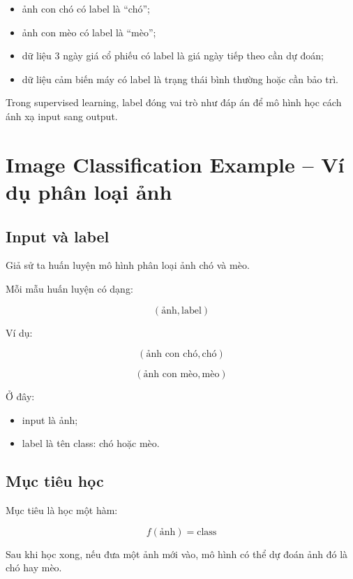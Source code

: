 \begin{itemize}
    \item ảnh con chó có label là ``chó'';
    \item ảnh con mèo có label là ``mèo'';
    \item dữ liệu 3 ngày giá cổ phiếu có label là giá ngày tiếp theo cần dự đoán;
    \item dữ liệu cảm biến máy có label là trạng thái bình thường hoặc cần bảo trì.
\end{itemize}

\begin{ghinho}
Trong supervised learning, label đóng vai trò như đáp án để mô hình học cách ánh xạ input sang output.
\end{ghinho}

\section{Image Classification Example -- Ví dụ phân loại ảnh}

\subsection{Input và label}

Giả sử ta huấn luyện mô hình phân loại ảnh chó và mèo.

Mỗi mẫu huấn luyện có dạng:

\[
    (\text{ảnh}, \text{label})
\]

Ví dụ:

\[
    (\text{ảnh con chó}, \text{chó})
\]

\[
    (\text{ảnh con mèo}, \text{mèo})
\]

Ở đây:

\begin{itemize}
    \item input là ảnh;
    \item label là tên class: chó hoặc mèo.
\end{itemize}

\subsection{Mục tiêu học}

Mục tiêu là học một hàm:

\[
    f(\text{ảnh}) = \text{class}
\]

Sau khi học xong, nếu đưa một ảnh mới vào, mô hình có thể dự đoán ảnh đó là chó hay mèo.


